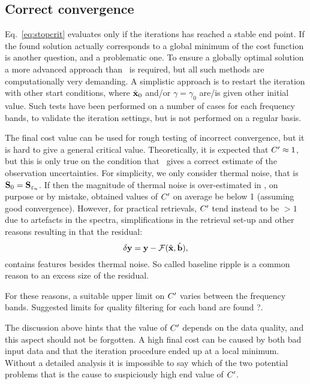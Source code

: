 \subsection{Correct convergence}
%
Eq.~\ref{eq:stopcrit} evaluates only if the iterations has reached a stable end
point. If the found solution actually corresponds to a global minimum of the
cost function is another question, and a problematic one. To ensure a globally
optimal solution a more advanced approach than \LM\ is required, but all
such methods are computationally very demanding. A simplistic approach is to
restart the iteration with other start conditions, where $\hat{\mathbf{x}}_0$ and/or
$\gamma=\gamma_0$ are/is given other initial value. Such tests have been
performed on a number of cases for each frequency bands, to validate the
iteration settings, but is not performed on a regular basis.

The final cost value can be used for rough testing of incorrect convergence,
but it is hard to give a general critical value. Theoretically, it is expected
that $C'\approx1$, but this is only true on the condition that
\ gives a correct estimate of the observation uncertainties. For
simplicity, we only consider thermal noise, that is
$\mathbf{S}_{0}=\mathbf{S}_{\varepsilon_n}$. If then the magnitude of thermal noise is
over-estimated in , on purpose or by mistake, obtained values of
$C'$  on average be below 1 (assuming good convergence). However, for
practical retrievals, $C'$ tend instead to be $>1$ due to artefacts in
the spectra, simplifications in the retrieval set-up and other reasons
resulting in that the residual:
\begin{equation}
  \label{eq:dy}
  \delta\mathbf{y} = \mathbf{y}-\mathcal{F}(\hat{\mathbf{x}},\hat{\mathbf{b}}),
\end{equation}
contains features besides thermal noise. So called baseline ripple is a common
reason to an excess size of the residual.

For these reasons, a suitable upper limit on $C'$ varies between the
frequency bands. Suggested limits for quality filtering for each band are found
?. 

The discussion above hints that the value of $C'$ depends on the data
quality, and this aspect should not be forgotten. A high final
cost can be caused by both bad input data and that the iteration procedure
ended up at a local minimum. Without a detailed analysis it is impossible to say
which of the two potential problems that is the cause to suspiciously high end
value of $C'$.  
\\


